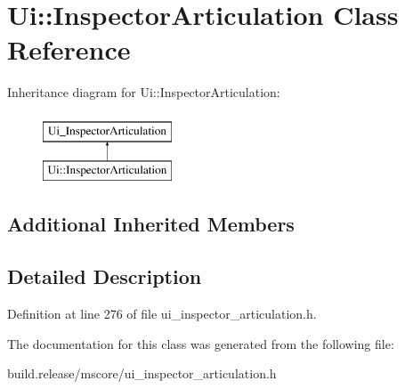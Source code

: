 \hypertarget{class_ui_1_1_inspector_articulation}{}\section{Ui\+:\+:Inspector\+Articulation Class Reference}
\label{class_ui_1_1_inspector_articulation}
Inheritance diagram for Ui\+:\+:Inspector\+Articulation\+:\begin{figure}[H]
\begin{center}
\leavevmode
\includegraphics[height=2.000000cm]{class_ui_1_1_inspector_articulation}
\end{center}
\end{figure}
\subsection*{Additional Inherited Members}


\subsection{Detailed Description}


Definition at line 276 of file ui\+\_\+inspector\+\_\+articulation.\+h.



The documentation for this class was generated from the following file\+:\begin{DoxyCompactItemize}
\item 
build.\+release/mscore/ui\+\_\+inspector\+\_\+articulation.\+h\end{DoxyCompactItemize}
